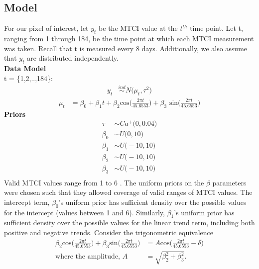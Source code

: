 \documentclass[12pt, a4paper]{article}
\begin{document}
\subsection{Model}
\qquad For our pixel of interest, let $y_{t}$ be the MTCI value at the $t^{th}$ time point. Let t, ranging from 1 through 184, be the time point at which each MTCI measurement was taken. Recall that t is measured every 8 days. Additionally, we also assume that $y_{t}$ are distributed independently.
\textbf{\\ Data Model}\\
 t = \{1,2,..,184\}:
\begin{equation}
\begin{split}
y_{t}
& \overset{ind}{\sim} N\big(\mu_{t}, \tau^2\big) 
\end{split}
\end{equation}
\begin{equation}
\begin{split}
\mu_{t}
& = \beta_{0} + \beta_{1}t + \beta_{2}\text{cos}\bigg(\frac{2\pi t}{45.6553}\bigg) + \beta_{3}\text{ sin}\bigg(\frac{2\pi t}{45.6553}\bigg)
\end{split}
\end{equation}
\textbf{Priors}
\begin{equation}
\begin{split}
\tau
& \sim Ca^{+}\big(0, 0.04)\\
\beta_{0}
& \sim U\big(0, 10)\\
\beta_{1}
& \sim U\big(-10, 10)\\
\beta_{2}
& \sim U\big(-10, 10)\\
\beta_{3}
& \sim U\big(-10, 10)\\
\end{split}
\end{equation}
\qquad Valid MTCI values range from 1 to 6 \cite{dash}. The uniform priors on the $\beta$ parameters were chosen such that they allowed coverage of valid ranges of MTCI values. The intercept term, $\beta_0$'s uniform prior has sufficient density over the possible values for the intercept (values between 1 and 6). Similarly, $\beta_1$'s uniform prior has sufficient density over the possible values for the linear trend term, including both positive and negative trends. Consider the trigonometric equivalence
\begin{equation*}
\begin{split}
\beta_{2}\text{cos}\bigg(\frac{2\pi t}{45.6553}\bigg) + \beta_{3}\text{sin}\bigg(\frac{2\pi t}{45.6553}\bigg) &= A \text{cos}\bigg(\frac{2\pi t}{45.6553} - \delta \bigg)\\
\text{where the amplitude, } A &= \sqrt{\beta_{2}^{2}+\beta_{3}^{2}}.
\end{split}
\end{equation*}
\end{document}
